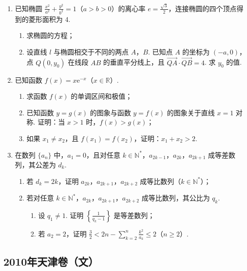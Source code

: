 \begin{description}
\begin{enumerate}[leftmargin=5pt]
        \item 已知椭圆 \(\frac{x^2}{a^2} + \frac{y^2}{b^2} = 1 \)（\(a > b > 0\)）的离心率 \(e = \frac{\sqrt{3}}{2}\)，连接椭圆的四个顶点得到的菱形面积为 4.
\begin{enumerate}
\item 求椭圆的方程；
\item 设直线 \(l\) 与椭圆相交于不同的两点 \(A\)，\(B\). 已知点 \(A\) 的坐标为 \((-a, 0)\)，点 \(Q(0, y_{0})\) 在线段 \(AB\) 的垂直平分线上，且 \(\overrightarrow{QA} \cdot \overrightarrow{QB} = 4\). 求 \(y_{0}\) 的值.
\end{enumerate}

        \item 已知函数 \( f(x) = x{\mathrm{e}}^{-x} \)（\(x \in \mathbb{R}\)）.
\begin{enumerate}
\item 求函数 \( f(x) \) 的单调区间和极值；
\item 已知函数 \( y = g(x) \) 的图象与函数 \( y = f(x) \) 的图象关于直线 \( x = 1 \) 对称. 证明：当 \( x > 1 \) 时，\( f(x) > g(x) \)；
\item 如果 \(x_{1} \neq x_{2}\)，且 \(f(x_{1}) = f(x_{2})\)，证明：\(x_{1} + x_{2} > 2\).
\end{enumerate}

        \item 在数列 \(\{a_{n}\}\) 中，\(a_{1} = 0\)，且对任意 \(k \in \mathbb{N}^*\)，\(a_{2k-1}\)，\(a_{2k}\)，\(a_{2k+1}\) 成等差数列，其公差为 \(d_{k}\).
\begin{enumerate}
\item 若 \(d_{k} = 2k\)，证明 \(a_{2k}\)，\(a_{2k+1}\)，\(a_{2k+2}\) 成等比数列（\(k \in \mathbb{N}^*\)）；
\item 若对任意 \(k \in \mathbb{N}^*\)，\(a_{2k}\)，\(a_{2k+1}\)，\(a_{2k+2}\) 成等比数列，其公比为 \(q_k\).
\begin{enumerate}
\item 设 \(q_{1} \neq 1\). 证明 \(\left\{\frac{1}{q_{k}-1}\right\}\) 是等差数列；
\item 若 \(a_2 = 2\)，证明 \(\frac{3}{2} < 2n - \sum_{k=2}^{n} \frac{k^2}{a_k} \leqslant 2\)（\(n \geqslant 2\)）.
\end{enumerate}
\end{enumerate}

    \end{enumerate}

\end{description}


\subsection{2010年天津卷（文）}\label{gk:2010年天津卷（文）}

